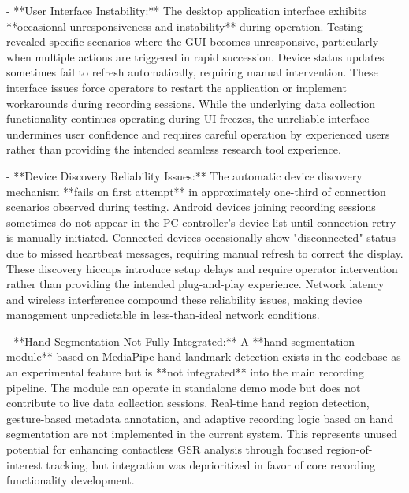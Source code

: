 \documentclass[12pt,a4paper]{article}
\begin{document}
{- **User Interface Instability:** The desktop application interface
  exhibits **occasional unresponsiveness and instability** during operation.
  Testing revealed specific scenarios where the GUI becomes unresponsive,
  particularly when multiple actions are triggered in rapid succession.
  Device status updates sometimes fail to refresh automatically, requiring
  manual intervention. These interface issues force operators to restart
  the application or implement workarounds during recording sessions.
  While the underlying data collection functionality continues operating
  during UI freezes, the unreliable interface undermines user confidence
  and requires careful operation by experienced users rather than
  providing the intended seamless research tool experience.

- **Device Discovery Reliability Issues:** The automatic device discovery
  mechanism **fails on first attempt** in approximately one-third of
  connection scenarios observed during testing. Android devices joining
  recording sessions sometimes do not appear in the PC controller's device
  list until connection retry is manually initiated. Connected devices
  occasionally show "disconnected" status due to missed heartbeat messages,
  requiring manual refresh to correct the display. These discovery hiccups
  introduce setup delays and require operator intervention rather than
  providing the intended plug-and-play experience. Network latency and
  wireless interference compound these reliability issues, making device
  management unpredictable in less-than-ideal network conditions.

- **Hand Segmentation Not Fully Integrated:** A **hand segmentation
  module** based on MediaPipe hand landmark detection exists in the
  codebase as an experimental feature but is **not integrated** into
  the main recording pipeline. The module can operate in standalone
  demo mode but does not contribute to live data collection sessions.
  Real-time hand region detection, gesture-based metadata annotation,
  and adaptive recording logic based on hand segmentation are not
  implemented in the current system. This represents unused potential
  for enhancing contactless GSR analysis through focused region-of-interest
  tracking, but integration was deprioritized in favor of core recording
  functionality development.

}
\end{document}
